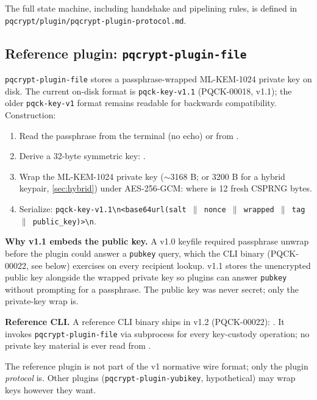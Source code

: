 The full state machine, including handshake and pipelining rules, is defined in \texttt{pqcrypt/plugin/pqcrypt-plugin-protocol.md}.

\subsection{Reference plugin: \texttt{pqcrypt-plugin-file}}
\label{sec:plugin-protocol:reference}

\texttt{pqcrypt-plugin-file} stores a passphrase-wrapped ML-KEM-1024 private key on disk. The current on-disk format is \texttt{pqck-key-v1.1} (PQCK-00018, v1.1); the older \texttt{pqck-key-v1} format remains readable for backwards compatibility. Construction:

\begin{enumerate}
\item Read the passphrase from the terminal (no echo) or from .
\item Derive a 32-byte symmetric key:  \citep{rfc9106}.
\item Wrap the ML-KEM-1024 private key ($\sim$3168 B; or 3200 B for a hybrid keypair, \cref{sec:hybrid}) under AES-256-GCM:  where  is 12 fresh CSPRNG bytes.
\item Serialize: \texttt{pqck-key-v1.1\textbackslash{}n\textless{}base64url(salt $\|$ nonce $\|$ wrapped $\|$ tag $\|$ public\_key)\textgreater\textbackslash{}n}.
\end{enumerate}

\textbf{Why v1.1 embeds the public key.} A v1.0 keyfile required passphrase unwrap before the plugin could answer a \texttt{pubkey} query, which the CLI binary (PQCK-00022, see below) exercises on every recipient lookup. v1.1 stores the unencrypted public key alongside the wrapped private key so plugins can answer \texttt{pubkey} without prompting for a passphrase. The public key was never secret; only the private-key wrap is.

\textbf{Reference CLI.} A reference CLI binary ships in v1.2 (PQCK-00022): . It invokes \texttt{pqcrypt-plugin-file} via subprocess for every key-custody operation; no private key material is ever read from .

The reference plugin is not part of the v1 normative wire format; only the plugin \emph{protocol} is. Other plugins (\texttt{pqcrypt-plugin-yubikey}, hypothetical) may wrap keys however they want.

